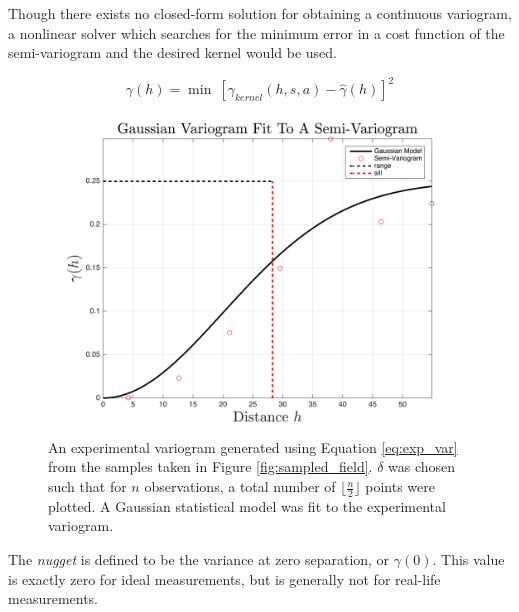 \documentclass[11pt]{ucthesis}
\begin{document}
Though there exists no closed-form solution for obtaining a continuous variogram, a nonlinear solver which searches for the minimum error in a cost function of the semi-variogram and the desired kernel would be used.

\begin{equation}
\gamma(h) = \min\ [\gamma_{kernel}(h,s,a) - \hat{\gamma}(h)]^2
\end{equation}


\begin{figure}[ht!]
    \centering    
	\includegraphics[width=\linewidth]{figures/fit_kernel.png}
	\caption{An experimental variogram generated using Equation \ref{eq:exp_var} from the samples taken in Figure \ref{fig:sampled_field}. $\delta$ was chosen such that for $n$ observations, a total number of $\Big\lfloor \frac{n}{2} \Big\rfloor$ points were plotted. A Gaussian statistical model was fit to the experimental variogram.}
	\label{fig:fit_kernel}
\end{figure}

The \textit{nugget} is defined to be the variance at zero separation, or $\gamma(0)$. This value is exactly zero for ideal measurements, but is generally not for real-life measurements.
\end{document}
